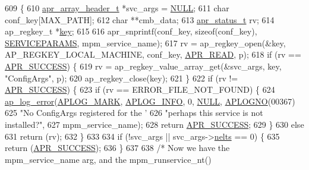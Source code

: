 \begin{DoxyCode}
609 \{
610     \hyperlink{structapr__array__header__t}{apr\_array\_header\_t} *svc\_args = \hyperlink{pcre_8txt_ad7f989d16aa8ca809a36bc392c07fba1}{NULL};
611     \textcolor{keywordtype}{char} conf\_key[MAX\_PATH];
612     \textcolor{keywordtype}{char} **cmb\_data;
613     \hyperlink{group__apr__errno_gaa5105fa83cc322f09382292db8b47593}{apr\_status\_t} rv;
614     ap\_regkey\_t *\hyperlink{group__MOD__CACHE_ga11d8023381192746eb96be162398fe1c}{key};
615 
616     apr\_snprintf(conf\_key, \textcolor{keyword}{sizeof}(conf\_key), \hyperlink{group__APACHE__MPM__WINNT_gaa61e8b42448defae941ff4c7740aa052}{SERVICEPARAMS}, mpm\_service\_name);
617     rv = ap\_regkey\_open(&key, AP\_REGKEY\_LOCAL\_MACHINE, conf\_key, \hyperlink{group__apr__file__open__flags_ga0021db78d799d1c8825b701c7efee483}{APR\_READ}, p);
618     \textcolor{keywordflow}{if} (rv == \hyperlink{group__apr__errno_ga9ee311b7bf1c691dc521d721339ee2a6}{APR\_SUCCESS}) \{
619         rv = ap\_regkey\_value\_array\_get(&svc\_args, key, \textcolor{stringliteral}{"ConfigArgs"}, p);
620         ap\_regkey\_close(key);
621     \}
622     \textcolor{keywordflow}{if} (rv != \hyperlink{group__apr__errno_ga9ee311b7bf1c691dc521d721339ee2a6}{APR\_SUCCESS}) \{
623         \textcolor{keywordflow}{if} (rv == ERROR\_FILE\_NOT\_FOUND) \{
624             \hyperlink{group__APACHE__CORE__LOG_ga5e6676c87418af7a1d323a116c78ecb4}{ap\_log\_error}(\hyperlink{group__APACHE__CORE__LOG_ga655e126996849bcb82e4e5a14c616f4a}{APLOG\_MARK}, \hyperlink{group__APACHE__CORE__LOG_ga47fafbef7e478babdd92e90407f95b19}{APLOG\_INFO}, 0, 
      \hyperlink{pcre_8txt_ad7f989d16aa8ca809a36bc392c07fba1}{NULL}, \hyperlink{group__APACHE__CORE__LOG_ga1dee8a07e06bc5b3de8b89662c2cd666}{APLOGNO}(00367)
625                          \textcolor{stringliteral}{"No ConfigArgs registered for the '%
626                          \textcolor{stringliteral}{"perhaps this service is not installed?"},
627                          mpm\_service\_name);
628             \textcolor{keywordflow}{return} \hyperlink{group__apr__errno_ga9ee311b7bf1c691dc521d721339ee2a6}{APR\_SUCCESS};
629         \}
630         \textcolor{keywordflow}{else}
631             \textcolor{keywordflow}{return} (rv);
632     \}
633 
634     \textcolor{keywordflow}{if} (!svc\_args || svc\_args->\hyperlink{structapr__array__header__t_ab11b88220885c5a0920a06ac85680055}{nelts} == 0) \{
635         \textcolor{keywordflow}{return} (\hyperlink{group__apr__errno_ga9ee311b7bf1c691dc521d721339ee2a6}{APR\_SUCCESS});
636     \}
637 
638     \textcolor{comment}{/* Now we have the mpm\_service\_name arg, and the mpm\_runservice\_nt()}
}
\end{DoxyCode}

